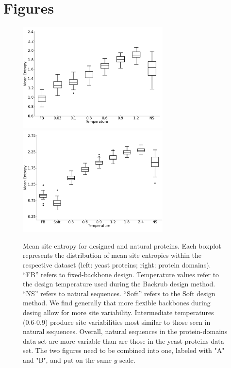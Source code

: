 \documentclass[12pt]{article}
\begin{document}
\cleardoublepage

\section{Figures}

\begin{figure}[H]
\centerline{\includegraphics[width = 3in]{figures/Mean_Entropy_vs_Temp_Boxplot.png}\includegraphics[width = 3in]{figures/Mean_Entropy_vs_Temp_Boxplot_Noah.png}}
\caption{Mean site entropy for designed and natural proteins. Each boxplot represents the distribution of mean site entropies within the respective dataset (left: yeast proteins; right: protein domains). ``FB'' refers to fixed-backbone design. Temperature values refer to the design temperature used during the Backrub design method. ``NS'' refers to natural sequences. ``Soft'' refers to the Soft design method. We find generally that more flexible backbones during desing allow for more site variability. Intermediate temperatures (0.6-0.9) produce site variabilities most similar to those seen in natural sequences. Overall, natural sequences in the protein-domains data set are more variable than are those in the yeast-proteins data set. {\color{red}The two figures need to be combined into one, labeled with "A" and "B", and put on the same $y$ scale.}}
\label{MeanEntropyComparison}
\end{figure}
\end{document}
